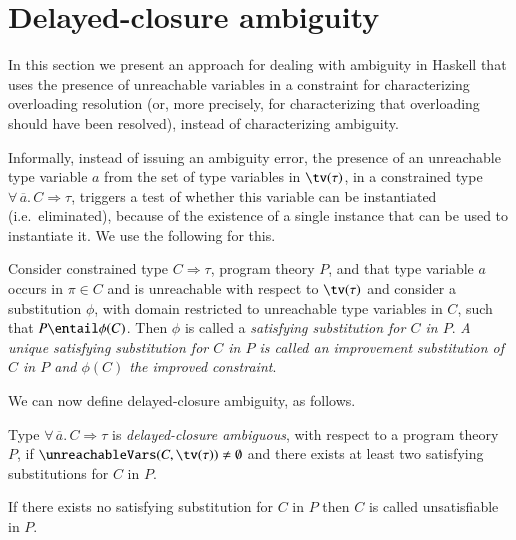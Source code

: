 \documentclass[review]{elsarticle}
\begin{document}
\section{Delayed-closure ambiguity}
\label{Delayed-closure-ambiguity}

In this section we present an approach for dealing with ambiguity in
Haskell that uses the presence of unreachable variables in a
constraint for characterizing overloading resolution (or, more
precisely, for characterizing that overloading should have been
resolved), instead of characterizing ambiguity. 



Informally, instead of issuing an ambiguity error, the presence of an
unreachable type variable $a$ from the set of type variables in
$\tv(\tau)$, in a constrained type
$\forall\,\overline{a}.\,C\Rightarrow \tau$, triggers a test of
whether this variable can be instantiated (i.e.~eliminated), because
of the existence of a single instance that can be used to instantiate
it. We use the following for this.

\begin{Definition}

Consider constrained type $C\Rightarrow \tau$, program theory $P$, and
that type variable $a$ occurs in $\pi\in C$ and is unreachable with
respect to $\tv(\tau)$ and consider a substitution $\phi$, with domain
restricted to unreachable type variables in $C$, such that $P \entail
\phi(C)$.  Then $\phi$ is called a {\em satisfying substitution for
  $C$ in $P$}. 
{\em A unique satisfying substitution for $C$ in $P$ is called an
  improvement substitution of $C$ in $P$ and $\phi(C)$ the improved
  constraint}.

\end{Definition}

We can now define delayed-closure ambiguity, as follows.

\begin{Definition}
Type $\forall\,\overline{a}.\,C \Rightarrow \tau$ is
\emph{delayed-closure ambiguous\/}, with respect to a program theory
$P$, if $\unreachableVars(C,\tv(\tau)) \not= \emptyset$ and there
exists at least two satisfying substitutions for $C$ in $P$.  

If there exists no satisfying substitution for $C$ in $P$ then $C$ is
called unsatisfiable in $P$.
\end{Definition}
\end{document}
